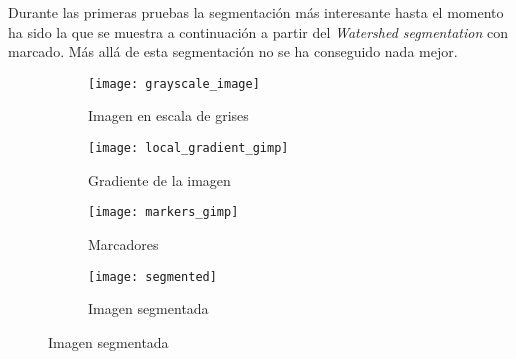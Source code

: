 Durante las primeras pruebas la segmentación más interesante hasta el momento ha sido la que se muestra a continuación a partir del \textit{Watershed segmentation} con marcado. Más allá de esta segmentación no se ha conseguido nada mejor.

\begin{figure}
	\centering
	\begin{subfigure}[b]{0.45\textwidth}
        \texttt{[image: grayscale\_image]}
        \caption{Imagen en escala de grises}
    \end{subfigure}
    \begin{subfigure}[b]{0.45\textwidth}
        \texttt{[image: local\_gradient\_gimp]}
        \caption{Gradiente de la imagen}
    \end{subfigure}
    \begin{subfigure}[b]{0.45\textwidth}
        \texttt{[image: markers\_gimp]}
        \caption{Marcadores}
    \end{subfigure}
        \begin{subfigure}[b]{0.45\textwidth}
        \texttt{[image: segmented]}
        \caption{Imagen segmentada}
    \end{subfigure}
\end{figure} 	